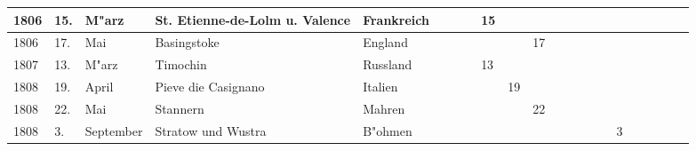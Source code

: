 \documentclass[a4paper, 8pt, oneside, polutonikogreek, german]{article}
\begin{document}
\begin{landscape}
\begin{table}[H]
\begin{longtable}{|p{5mm}|p{4mm}|p{13mm}|p{22mm}|p{15mm}|p{4mm}|p{6mm}|p{6mm}|p{6mm}|p{4mm}|p{5mm}|p{4mm}|p{5mm}|p{6mm}|p{5mm}|p{5mm}|p{5mm}|}
        1806 & 15. & M"arz & St. Etienne-de-Lolm u. Valence & Frankreich & ~ & ~ & 15 & ~ & ~ & ~ & ~ & ~ & ~ & ~ & ~ & ~ \\ \hline
        1806 & 17. & Mai & Basingstoke & England & ~ & ~ & ~ & ~ & 17 & ~ & ~ & ~ & ~ & ~ & ~ & ~ \\ \hline
        1807 & 13. & M"arz & Timochin & Russland & ~ & ~ & 13 & ~ & ~ & ~ & ~ & ~ & ~ & ~ & ~ & ~ \\ \hline
        1808 & 19. & April & Pieve die Casignano & Italien & ~ & ~ & ~ & 19 & ~ & ~ & ~ & ~ & ~ & ~ & ~ & ~ \\ \hline
        1808 & 22. & Mai & Stannern & Mahren & ~ & ~ & ~ & ~ & 22 & ~ & ~ & ~ & ~ & ~ & ~ & ~ \\ \hline
        1808 & 3. & September & Stratow und Wustra & B"ohmen & ~ & ~ & ~ & ~ & ~ & ~ & ~ & ~ & 3 & ~ & ~ & ~ \\ \hline
    \end{longtable}
\end{table}
\end{landscape}
\clearpage
\end{document}
